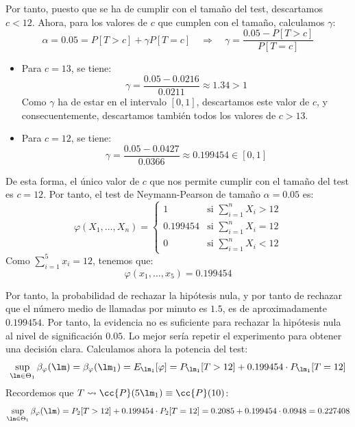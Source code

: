 \begin{ejercicio}
    Por tanto, puesto que se ha de cumplir con el tamaño del test, descartamos $c<12$. Ahora, para los valores de $c$ que cumplen con el tamaño, calculamos $\gamma$:
    \begin{equation*}
        \alpha = 0.05 = P[T>c] + \gamma P[T=c] \quad\Longrightarrow\quad \gamma = \frac{0.05-P[T>c]}{P[T=c]}
    \end{equation*}
    \begin{itemize}
        \item Para $c=13$, se tiene:
            \begin{equation*}
                \gamma = \frac{0.05-0.0216}{0.0211} \approx 1.34>1
            \end{equation*}
            Como $\gamma$ ha de estar en el intervalo $[0,1]$, descartamos este valor de $c$, y consecuentemente, descartamos también todos los valores de $c>13$.
        \item Para $c=12$, se tiene:
            \begin{equation*}
                \gamma = \frac{0.05-0.0427}{0.0366} \approx 0.199454 \in [0,1]
            \end{equation*}
    \end{itemize}

    De esta forma, el único valor de $c$ que nos permite cumplir con el tamaño del test es $c=12$. Por tanto, el test de Neymann-Pearson de tamaño $\alpha=0.05$ es:
    \begin{equation*}
        \varphi(X_1, \ldots, X_n) = \left\{\begin{array}{ll}
            1 & \text{si\ } \sum\limits_{i=1}^{n}X_i>12 \\
             0.199454 & \text{si\ } \sum\limits_{i=1}^{n}X_i = 12 \\
             0 & \text{si\ } \sum\limits_{i=1}^{n}X_i < 12
        \end{array}\right. 
    \end{equation*}
    Como $\sum\limits_{i=1}^{5} x_i = 12$, tenemos que:
    \begin{equation*}
        \varphi(x_1, \ldots, x_5) = 0.199454
    \end{equation*}

    Por tanto, la probabilidad de rechazar la hipótesis nula, y por tanto de rechazar que el número medio de llamadas por minuto es $1.5$, es de aproximadamente $0.199454$. Por tanto, la evidencia no es suficiente para rechazar la hipótesis nula al nivel de significación $0.05$. Lo mejor sería repetir el experimento para obtener una decisión clara. Calculamos ahora la potencia del test:
    \begin{equation*}
        \sup_{\lm \in \Theta_1}\beta_\varphi(\lm) = \beta_\varphi(\lm_1) = E_{\lm_1}[\varphi] = P_{\lm_1}[T>12] + 0.199454\cdot  P_{\lm_1}[T=12]
    \end{equation*}
    Recordemos que $T\rightsquigarrow \cc{P}(5\lm_1)\equiv \cc{P}(10)$:
    \begin{equation*}
        \sup_{\lm\in \Theta_1}\beta_\varphi(\lm) = P_2[T> 12] + 0.199454 \cdot P_2[T=12] = 0.2085 + 0.199454 \cdot 0.0948 = 0.227408
    \end{equation*}
\end{ejercicio}

